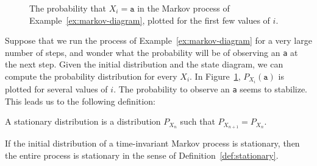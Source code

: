 \begin{figure}[h]
	\centering
	\caption{The probability that $X_i = \texttt{a}$ in the Markov process of Example~\ref{ex:markov-diagram}, plotted for the first few values of $i$.}\label{fig:stationary-distribution}
\end{figure}
Suppose that we run the process of Example~\ref{ex:markov-diagram} for a very large number of steps, and wonder what the probability will be of observing an \texttt{a} at the next step. Given the initial distribution and the state diagram, we can compute the probability distribution for every $X_i$. In Figure~\ref{fig:stationary-distribution}, $P_{X_i}(\texttt{a})$ is plotted for several values of $i$. The probability to observe an \texttt{a} seems to stabilize. This leads us to the following definition:


\begin{definition}
A stationary distribution is a distribution $P_{X_n}$ such that $P_{X_{n+1}} = P_{X_n}$.
\end{definition}
If the initial distribution of a time-invariant Markov process is stationary, then the entire process is stationary in the sense of Definition~\ref{def:stationary}.

